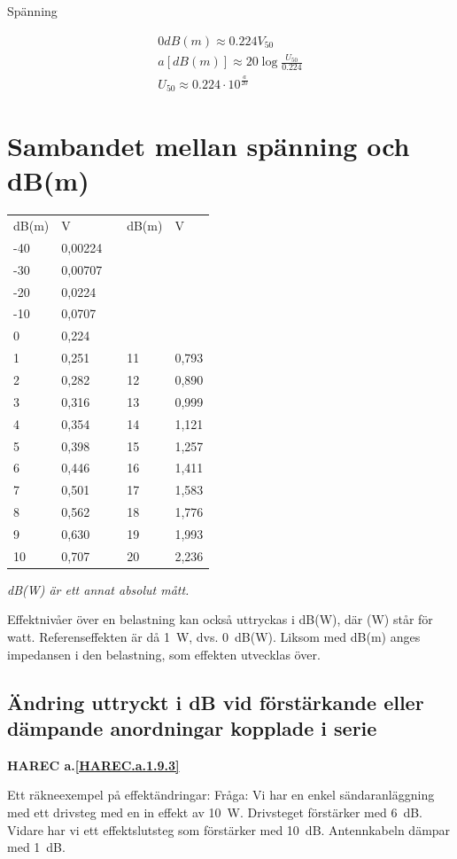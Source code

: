 Spänning

\begin{gather*}
	0 dB(m) \approx 0.224 V_{50} \\
	a [dB(m)] \approx 20 \log\frac{U_{50}}{0.224} \\
	U_{50} \approx 0.224 \cdot 10^{\frac{a}{20}}
\end{gather*}

\section[Sambandet spänning och dB(m)]{Sambandet mellan spänning och dB(m)}
\begin{tabular}{l|lp{1cm}l|l}
	dB(m) & V & & dB(m) & V \\
	\cline{1-2} \cline{4-5}
	-40 & 0,00224 & & & \\
	-30 & 0,00707 & & & \\
	-20 & 0,0224  & & & \\
	-10 & 0,0707  & & & \\
	0   & 0,224   & & & \\
	1   & 0,251   & & 11 & 0,793 \\
	2   & 0,282   & & 12 & 0,890 \\
	3   & 0,316   & & 13 & 0,999 \\
	4   & 0,354   & & 14 & 1,121 \\
	5   & 0,398   & & 15 & 1,257 \\
	6   & 0,446   & & 16 & 1,411 \\
	7   & 0,501   & & 17 & 1,583 \\
	8   & 0,562   & & 18 & 1,776 \\
	9   & 0,630   & & 19 & 1,993 \\
	10  & 0,707   & & 20 & 2,236
\end{tabular}

\emph{dB(W) är ett annat absolut mått.}

Effektnivåer över en belastning kan också uttryckas i dB(W), där (W)
står för watt. Referenseffekten är då 1~W, dvs. 0~dB(W).
Liksom med dB(m) anges impedansen i den belastning, som effekten utvecklas över.

\subsection{Ändring uttryckt i dB vid förstärkande eller dämpande anordningar kopplade i serie}
\textbf{HAREC a.\ref{HAREC.a.1.9.3}\label{myHAREC.a.1.9.3}}

Ett räkneexempel på effektändringar:
Fråga:
Vi har en enkel sändaranläggning med ett drivsteg med en in effekt av 10~W.
Drivsteget förstärker med 6~dB. Vidare har vi ett effektslutsteg som förstärker
med 10~dB. Antennkabeln dämpar med 1~dB.

